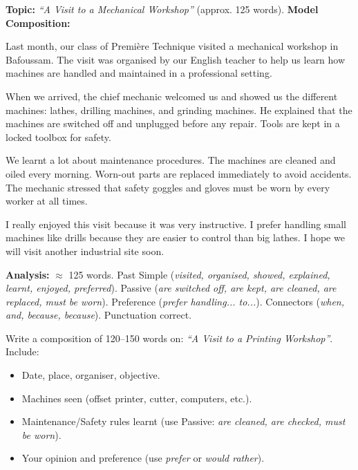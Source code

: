 \documentclass[11pt]{article}
\begin{document}
\begin{exoresolu}
\textbf{Topic:} \emph{``A Visit to a Mechanical Workshop''} (approx. 125 words).
\tcblower
\textbf{Model Composition:}

Last month, our class of Première Technique visited a mechanical workshop in Bafoussam. The visit was organised by our English teacher to help us learn how machines are handled and maintained in a professional setting.

When we arrived, the chief mechanic welcomed us and showed us the different machines: lathes, drilling machines, and grinding machines. He explained that the machines are switched off and unplugged before any repair. Tools are kept in a locked toolbox for safety.

We learnt a lot about maintenance procedures. The machines are cleaned and oiled every morning. Worn-out parts are replaced immediately to avoid accidents. The mechanic stressed that safety goggles and gloves must be worn by every worker at all times.

I really enjoyed this visit because it was very instructive. I prefer handling small machines like drills because they are easier to control than big lathes. I hope we will visit another industrial site soon.

\textbf{Analysis:} $\approx$ 125 words. Past Simple (\emph{visited, organised, showed, explained, learnt, enjoyed, preferred}). Passive (\emph{are switched off, are kept, are cleaned, are replaced, must be worn}). Preference (\emph{prefer handling... to...}). Connectors (\emph{when, and, because, because}). Punctuation correct.
\end{exoresolu}

\begin{exercice}
Write a composition of 120--150 words on: \emph{``A Visit to a Printing Workshop''}.
Include:
\begin{itemize}
\item Date, place, organiser, objective.
\item Machines seen (offset printer, cutter, computers, etc.).
\item Maintenance/Safety rules learnt (use Passive: \emph{are cleaned, are checked, must be worn}).
\item Your opinion and preference (use \emph{prefer} or \emph{would rather}).
\end{itemize}
\end{exercice}
\end{document}
